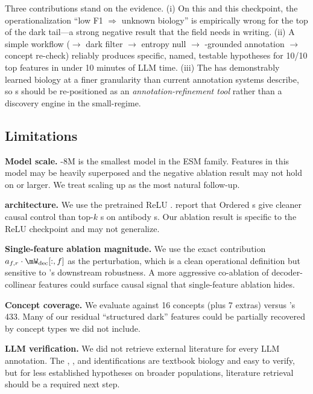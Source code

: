  Three contributions stand on the evidence. (i) On this \plm and this \sae checkpoint, the operationalization ``low \swissprot F1 $\Rightarrow$ unknown biology'' is empirically wrong for the top of the dark tail---a strong negative result that the field needs in writing. (ii) A simple workflow (\sae $\rightarrow$ dark filter $\rightarrow$ entropy null $\rightarrow$ \plm-grounded annotation $\rightarrow$ concept re-check) reliably produces specific, named, testable hypotheses for 10/10 top features in under 10 minutes of LLM time. (iii) The \sae has demonstrably learned biology at a finer granularity than current annotation systems describe, so \sae{}s should be re-positioned as an \emph{annotation-refinement tool} rather than a discovery engine in the small-\plm regime.

\subsection{Limitations}

\textbf{Model scale.} \esm-8M is the smallest model in the ESM family. Features in this model may be heavily superposed and the negative ablation result may not hold on \esmlarge or larger. We treat scaling up as the most natural follow-up.

\textbf{\sae architecture.} We use the pretrained ReLU \sae. \citet{haque2026antibody} report that Ordered \sae{}s give cleaner causal control than top-$k$ \sae{}s on antibody \plm{}s. Our ablation result is specific to the ReLU checkpoint and may not generalize.

\textbf{Single-feature ablation magnitude.} We use the exact contribution $a_{f,r} \cdot \mW_{\text{dec}}[:, f]$ as the perturbation, which is a clean operational definition but sensitive to \esm{}'s downstream robustness. A more aggressive co-ablation of decoder-collinear features could surface causal signal that single-feature ablation hides.

\textbf{Concept coverage.} We evaluate against 16 \swissprot concepts (plus 7 extras) versus \interplm's 433. Many of our residual ``structured dark'' features could be partially recovered by concept types we did not include.

\textbf{LLM verification.} We did not retrieve external literature for every LLM annotation. The \tgekp, \dry, and \npxxy identifications are textbook biology and easy to verify, but for less established hypotheses on broader populations, literature retrieval should be a required next step.

